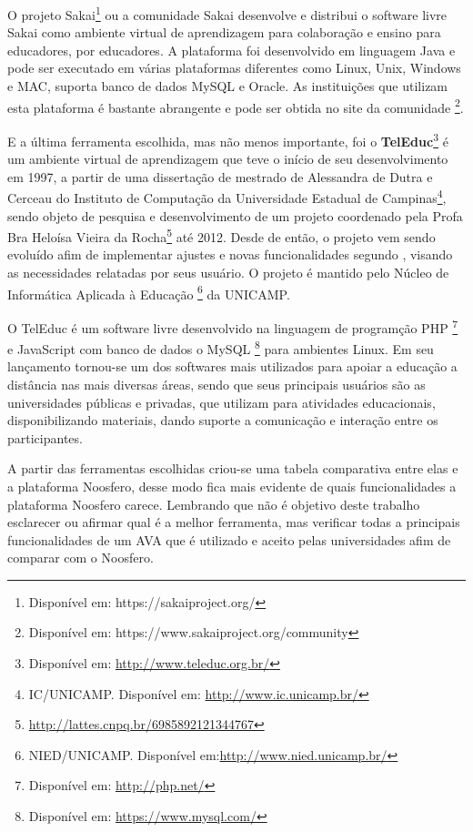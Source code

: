O projeto Sakai\footnote{Disponível em: https://sakaiproject.org/ } ou a comunidade Sakai desenvolve e distribui o software livre Sakai como ambiente virtual de aprendizagem para colaboração e ensino para educadores, por educadores. A plataforma foi desenvolvido em linguagem Java e pode ser executado em várias plataformas diferentes como Linux, Unix, Windows e MAC, suporta banco de dados MySQL e Oracle. As instituições que utilizam esta plataforma é bastante abrangente e pode ser obtida no site da comunidade \footnote{Disponível em: https://www.sakaiproject.org/community}.

E a última ferramenta escolhida, mas não menos importante, foi o \textbf{TelEduc}\footnote{Disponível em: \url{http://www.teleduc.org.br/}} é um ambiente virtual de aprendizagem que teve o início de seu desenvolvimento em 1997, a partir de uma dissertação de mestrado de Alessandra de Dutra e Cerceau do Instituto de Computação da Universidade Estadual de Campinas\footnote{IC/UNICAMP. Disponível em: \url{http://www.ic.unicamp.br/}}, sendo objeto de pesquisa e desenvolvimento de um projeto coordenado pela Profa Bra Heloísa Vieira da Rocha\footnote{\url{http://lattes.cnpq.br/6985892121344767}} até 2012. Desde de então, o projeto vem sendo evoluído afim de implementar ajustes e novas funcionalidades segundo \cite{rocha2002ambiente}, visando as necessidades relatadas por seus usuário. O projeto é mantido pelo Núcleo de Informática Aplicada à Educação \footnote{NIED/UNICAMP. Disponível em:\url{http://www.nied.unicamp.br/}} da UNICAMP.

O TelEduc é um software livre desenvolvido na linguagem de programção PHP \footnote{Disponível em: \url{http://php.net/}} e JavaScript com banco de dados o MySQL \footnote{Disponível em: \url{https://www.mysql.com/}} para ambientes Linux. Em seu lançamento tornou-se um dos softwares mais utilizados para apoiar a educação a distância nas mais diversas áreas, sendo que seus principais usuários são as universidades públicas e privadas, que utilizam para atividades educacionais, disponibilizando materiais, dando suporte a comunicação e interação entre os participantes.

A partir das ferramentas escolhidas criou-se uma tabela comparativa entre elas e a plataforma Noosfero, desse modo fica mais evidente de quais funcionalidades a plataforma Noosfero carece. Lembrando que não é objetivo deste trabalho esclarecer ou afirmar qual  é a melhor ferramenta, mas verificar todas a principais funcionalidades de um AVA que é utilizado e aceito pelas universidades afim de comparar com o Noosfero.

